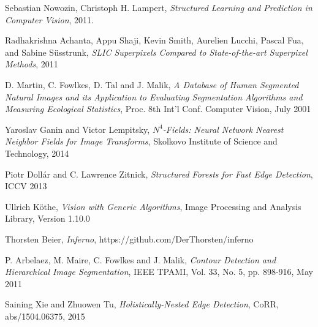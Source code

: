 
\manualmark
\markboth{\spacedlowsmallcaps{\bibname}}{\spacedlowsmallcaps{\bibname}} %
{}
\label{app:bibliography}




\begin{thebibliography}{9}

  Sebastian Nowozin, Christoph H. Lampert,
  \emph{Structured Learning and Prediction in Computer Vision},
  2011.
  
  Radhakrishna Achanta, Appu Shaji, Kevin Smith, Aurelien Lucchi, Pascal Fua, and Sabine Süsstrunk, 
  \emph{SLIC Superpixels Compared to State-of-the-art Superpixel Methods},
  2011
  
	D. Martin, C. Fowlkes, D. Tal and J. Malik,
	\emph{A Database of Human Segmented Natural Images and its
	           Application to Evaluating Segmentation Algorithms and
	           Measuring Ecological Statistics},
	Proc. 8th Int'l Conf. Computer Vision,
	July 2001		
	
	Yaroslav Ganin and Victor Lempitsky,
	\emph{$N^4$-Fields: Neural Network Nearest Neighbor Fields for Image Transforms},
	Skolkovo Institute of Science and Technology,
	2014
	
  Piotr Dollár and C. Lawrence Zitnick,
  \emph{Structured Forests for Fast Edge Detection},
  ICCV 2013
  
 	Ullrich Köthe,
 	\emph{Vision with Generic Algorithms},
 	Image Processing and Analysis Library,
 	Version 1.10.0
 	
 	Thorsten Beier, 
 	\emph{Inferno}, 
 	https://github.com/DerThorsten/inferno
 	
 	P. Arbelaez, M. Maire, C. Fowlkes and J. Malik, 
 	\emph{Contour Detection and Hierarchical Image Segmentation},
 	IEEE TPAMI, Vol. 33, No. 5, pp. 898-916, May 2011
 	
 	Saining Xie and Zhuowen Tu,
 	\emph{Holistically-Nested Edge Detection},
 	CoRR, abs/1504.06375, 2015
 

\end{thebibliography}
